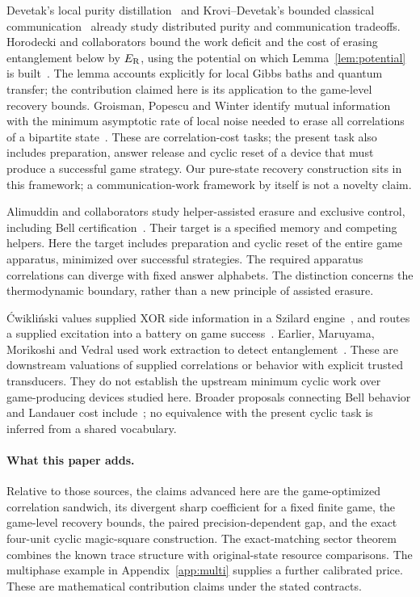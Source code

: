 Devetak's local purity distillation~\cite{devetak} and Krovi--Devetak's bounded classical communication~\cite{krovi} already study distributed purity and communication tradeoffs. Horodecki and collaborators bound the work deficit and the cost of erasing entanglement below by $E_{\mathrm R}$, using the potential on which Lemma~\ref{lem:potential} is built~\cite{localnonlocal}. The lemma accounts explicitly for local Gibbs baths and quantum transfer; the contribution claimed here is its application to the game-level recovery bounds. Groisman, Popescu and Winter identify mutual information with the minimum asymptotic rate of local noise needed to erase all correlations of a bipartite state~\cite{gpw}. These are correlation-cost tasks; the present task also includes preparation, answer release and cyclic reset of a device that must produce a successful game strategy. Our pure-state recovery construction sits in this framework; a communication-work framework by itself is not a novelty claim.

Alimuddin and collaborators study helper-assisted erasure and exclusive control, including Bell certification~\cite{alimuddin}. Their target is a specified memory and competing helpers. Here the target includes preparation and cyclic reset of the entire game apparatus, minimized over successful strategies. The required apparatus correlations can diverge with fixed answer alphabets. The distinction concerns the thermodynamic boundary, rather than a new principle of assisted erasure.

\'Cwikli\'nski values supplied XOR side information in a Szilard engine~\cite{szilard}, and routes a supplied excitation into a battery on game success~\cite{battery}. Earlier, Maruyama, Morikoshi and Vedral used work extraction to detect entanglement~\cite{thermodetection}. These are downstream valuations of supplied correlations or behavior with explicit trusted transducers. They do not establish the upstream minimum cyclic work over game-producing devices studied here. Broader proposals connecting Bell behavior and Landauer cost include~\cite{todd}; no equivalence with the present cyclic task is inferred from a shared vocabulary.

\paragraph{What this paper adds.}
Relative to those sources, the claims advanced here are the game-optimized correlation sandwich, its divergent sharp coefficient for a fixed finite game, the game-level recovery bounds, the paired precision-dependent gap, and the exact four-unit cyclic magic-square construction. The exact-matching sector theorem combines the known trace structure with original-state resource comparisons. The multiphase example in Appendix~\ref{app:multi} supplies a further calibrated price. These are mathematical contribution claims under the stated contracts.

